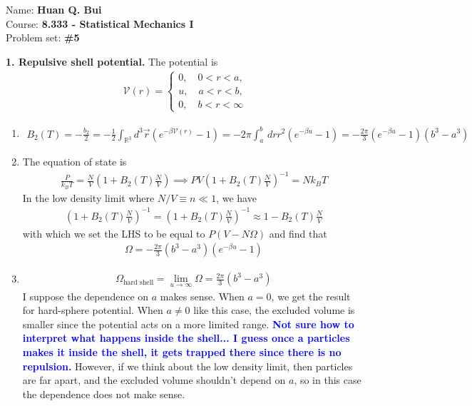 \documentclass{article}
\theoremstyle{definition}
\newcommand{\be}{\beta}
\newcommand{\f}[2]{\frac{#1}{#2}}
\newcommand{\lp}{\left(}
\newcommand{\rp}{\right)}
\begin{document}
		\begin{framed}
			\noindent Name: \textbf{Huan Q. Bui}\\
			Course: \textbf{8.333 - Statistical Mechanics I}\\
			Problem set: \textbf{\#5}
		\end{framed}
	



\noindent \textbf{1. Repulsive shell potential.} The potential is 
\begin{align*}
\mathcal{V}(r) = \begin{cases}
0, \quad 0 < r < a,\\
u, \quad a < r < b,\\
0, \quad b < r < \infty
\end{cases}
\end{align*}

\begin{enumerate}[label=(\alph*)]
	\item 
	\begin{align*}
	B_2(T) = -\f{b_2}{2} = -\f{1}{2}\int_{\mathbb{R}^3} d^3 \vec{r} \lp e^{-\be \mathcal{V}(r)} - 1 \rp = -2\pi \int_a^b \,dr r^2 \lp e^{-\be u} - 1 \rp = \boxed{-\f{2\pi}{3} \lp e^{-\be u } - 1 \rp (b^3 - a^3)}
	\end{align*}
	\item The equation of state is 
	\begin{align*}
	\f{P}{k_B T} = \f{N}{V}\lp 1 + B_2(T) \f{N}{V} \rp \implies PV \lp 1 + B_2(T)\f{N}{V} \rp^{-1} = N k_B T
	\end{align*}
	In the low density limit where $N/V \equiv n \ll 1$, we have
	\begin{align*}
	\lp 1 + B_2(T) \f{N}{V}  \rp^{-1} = \lp 1 + B_2(T) \f{N}{V}\rp^{-1} \approx 1 - B_2(T) \f{N}{V}
	\end{align*}
	with which we set the LHS to be equal to $P(V-N\Omega)$ and find that 
	\begin{align*}
	\boxed{\Omega = -\f{2\pi}{3} (b^3 - a^3) \lp e^{-\be u} - 1  \rp }
	\end{align*}
	
	
	\item 
	\begin{align*}
	\Omega_\text{hard shell} = \lim_{u\to \infty} \Omega = \boxed{\f{2\pi}{3} (b^3 - a^3) }
	\end{align*}
	I suppose the dependence on $a$ makes sense. When $a=0$, we get the result for hard-sphere potential. When $a\neq 0$ like this case, the excluded volume is smaller since the potential acts on a more limited range. \textbf{\textcolor{blue}{Not sure how to interpret what happens inside the shell... I guess once a particles makes it inside the shell, it gets trapped there since there is no repulsion.}} However, if we think about the low density limit, then particles are far apart, and the excluded volume shouldn't depend on $a$, so in this case the dependence does not make sense.
\end{enumerate}
\end{document}
